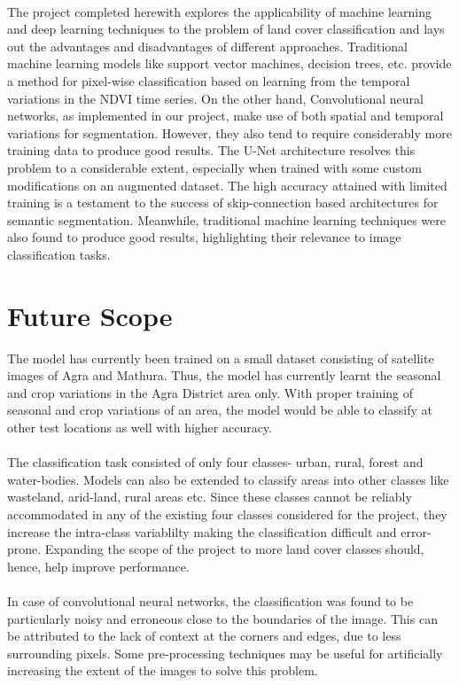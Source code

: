 \documentclass[12pt, a4paper]{report}
\begin{document}
\paragraph{}
The project completed herewith explores the applicability of machine learning and deep learning techniques to the problem of land cover classification and lays out the advantages and disadvantages of different approaches. Traditional machine learning models like support vector machines, decision trees, etc. provide a method for pixel-wise classification based on learning from the temporal variations in the NDVI time series. On the other hand, Convolutional neural networks, as implemented in our project, make use of both spatial and temporal variations for segmentation. However, they also tend to require considerably more training data to produce good results. The U-Net architecture resolves this problem to a considerable extent, especially when trained with some custom  modifications on an augmented dataset. The high accuracy attained with limited training is a testament to the success of skip-connection based architectures for semantic segmentation. Meanwhile, traditional machine learning techniques were also found to produce good results, highlighting their relevance to image classification tasks.

\section{Future Scope}
The model has currently been trained on a small dataset consisting of satellite images of Agra and Mathura. Thus, the model has currently learnt the seasonal and crop variations in the Agra District area only. With proper training of seasonal and crop variations of an area, the model would be able to classify at other test locations as well with higher accuracy. 
\paragraph{}
The classification task consisted of only four classes- urban, rural, forest and water-bodies. Models can also be extended to classify areas into other classes like wasteland, arid-land, rural areas etc. Since these classes cannot be reliably accommodated in any of the existing four classes considered for the project, they increase the intra-class variablilty making the classification difficult and error-prone. Expanding the scope of the project to more land cover classes should, hence, help improve performance.
\paragraph{}
In case of convolutional neural networks, the classification was found to be particularly noisy and erroneous close to the boundaries of the image. This can be attributed to the lack of context at the corners and edges, due to less surrounding pixels. Some pre-processing techniques may be useful for artificially increasing the extent of the images to solve this problem.
\end{document}
